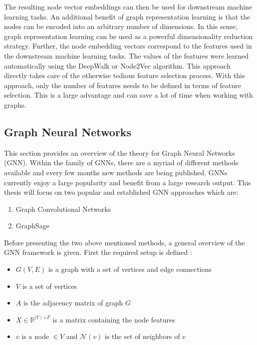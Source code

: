 	\noindent The resulting node vector embeddings can then be used for downstream
	machine learning tasks. An additional benefit of graph representation
	learning is that the nodes can be encoded into an arbitrary number of
	dimensions. In this sense, graph representation learning can be used as a
	powerful dimensionality reduction strategy. Further, the node embedding vectors
	correspond to the features used in the downstream machine learning tasks.
	The values of the features were learned automatically using the DeepWalk or
	Node2Vec algorithm. This approach directly takes care of the otherwise
	tedious feature selection process. With this approach, only the number of
	features needs to be defined in terms of feature selection. This is a large
	advantage and can save a lot of time when working with graphs. 

	\subsection{Graph Neural Networks}
	\label{section:GNN_theory}

	This section provides an overview of the theory for Graph Neural Networks
	(GNN). Within the family of GNNs, there are a myriad of different methods 
	available and every few months new methods are being published. GNNs 
	currently enjoy a large popularity and benefit from a large research output. 
	This thesis will focus on two popular and established GNN approaches which 
	are:

	\begin{enumerate}
		\item Graph Convolutional Networks
		\item GraphSage
	\end{enumerate}
	
	\noindent Before presenting the two above mentioned methods, a general
	overview of the GNN framework is given. First the required setup is
	defined \citep{leskovec2021lecture}:

	\begin{itemize}
		\setlength\itemsep{0.2em}
		\item $G(V,E)$ is a graph with a set of vertices and edge connections
		\item $V$ is a set of vertices
		\item $A$ is the adjacency matrix of graph $G$
		\item $X \in \mathbb{R}^{\mid V\mid \times F}$ is a matrix containing
			the node features
		\item $v$ is a node $\in V$ and $\mathcal{N}(v)$ is the set of
			neighbors of $v$
	\end{itemize}

